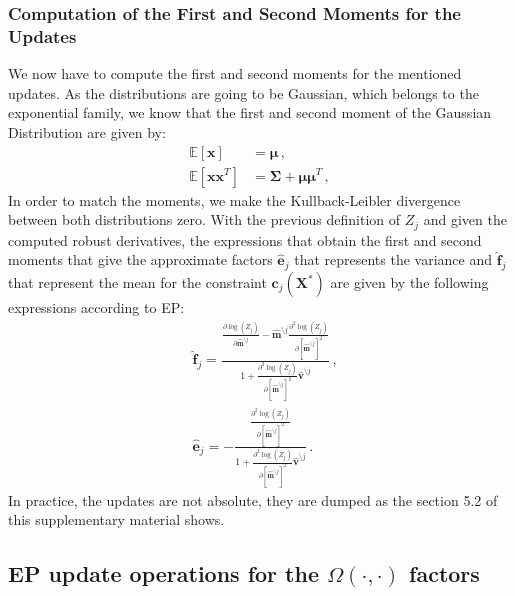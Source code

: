 \documentclass[review,preprint,12pt]{elsarticle}
\begin{document}
\subsubsection{Computation of the First and Second Moments for the Updates}

We now have to compute the first and second moments for the mentioned updates. As the distributions are going to be Gaussian, which belongs to the exponential family, we know that the first and second moment of the Gaussian Distribution are given by:
\begin{align}
\mathbb{E}[\boldsymbol{x}] & = \boldsymbol{\mu}\,,\\
\mathbb{E}[\boldsymbol{x}\boldsymbol{x}^T] & = \boldsymbol{\Sigma} + \boldsymbol{\mu}\boldsymbol{\mu}^T\,,
\end{align}
In order to match the moments, we make the Kullback-Leibler divergence between both distributions zero. With the previous definition of $Z_j$ and given the computed robust derivatives, the expressions that obtain the first and second moments that give the approximate factors $\boldsymbol{\hat{e}}_{j}$ that represents the variance and $\boldsymbol{\hat{f}}_{j}$ that represent the mean for the constraint $\boldsymbol{c}_j(\boldsymbol{X}^*)$ are given by the following expressions according to EP:
\begin{align}
& \boldsymbol{\hat{f}}_{j} = \frac{\frac{\partial \log(Z_j)}{\partial \boldsymbol{\hat{m}}^{\setminus j}} - \boldsymbol{\hat{m}}^{\setminus j}\frac{\partial^{2} \log(Z_j)}{\partial [\boldsymbol{\hat{m}}^{\setminus j}]^2}}{1+\frac{\partial^{2} \log(Z_j)}{\partial [\boldsymbol{\hat{m}}^{\setminus j}]^2}\boldsymbol{\hat{v}}^{\setminus j}}\,,\nonumber \\
& \boldsymbol{\hat{e}}_{j} = - \frac{\frac{\partial^{2} \log(Z_j)}{\partial [\boldsymbol{\hat{m}}^{\setminus j}]^2}}{1+\frac{\partial^{2} \log(Z_j)}{\partial [\boldsymbol{\hat{m}}^{\setminus j}]^2}\boldsymbol{\hat{v}}^{\setminus j}}\,.
\end{align}
In practice, the updates are not absolute, they are dumped as the section 5.2 of this supplementary material shows.

\subsection{EP update operations for the $\Omega(\cdot,\cdot)$ factors}
\end{document}
